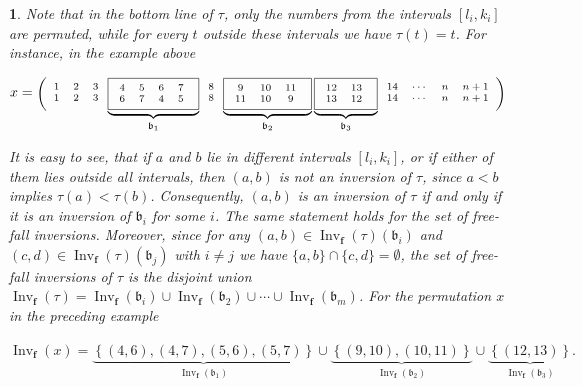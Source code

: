 \documentclass[a4 paper,12pt]{article}
\newcommand{\ger}[1]{\mathfrak{#1}}
\DeclareMathOperator{\Inv}{Inv}
\newtheorem{subnum}{}[numeris]
\begin{document}
\begin{subnum}
Note that in the bottom line of $\tau$, only the numbers from  the intervals $[l_i, k_i]$ are permuted, while for every $t$ outside these intervals we have $\tau(t) = t$. For instance, in the example above 
\begin{center}
$x =  \begin{scriptsize}\Bigg(
\begin{array}{ccc}
	1 & 2 & 3 \\
	1&2&  3
\end{array}
\underbrace{\framebox{$
\begin{array}{cccc}
	4 & 5 & 6&7 \\
	6 & 7 & 4&5
\end{array}$
}}_{\ger{b}_1}
\begin{array}{c}
	8\\
	8 
\end{array}
\underbrace{\framebox{$
\begin{array}{ccc}
	9 & 10 & 11  \\
	11 & 10 & 9 
\end{array}$
}}_{\ger{b}_2}\underbrace{\framebox{$
\begin{array}{cc}
	12 & 13   \\
	13 & 12 
\end{array}$
}}_{\ger{b}_3}
\begin{array}{cccc}
	14 & \cdots &n&n+1\\
	14 & \cdots &n&n+1
\end{array} \Bigg)\end{scriptsize}$
\end{center}
It is easy to see, that if $a$ and $b$ lie in different intervals $[l_i, k_i]$, or if either of them lies outside all intervals, then $(a,b)$ is not an inversion of $\tau$, since $a<b$ implies $\tau(a)<\tau(b)$. Consequently, $(a,b)$ is an inversion of $\tau$ if and only if it is an inversion of $\ger{b}_i$ for some $i$. The same statement holds for the set of free-fall inversions.  Moreover, since for any $(a,b) \in \Inv_{\textbf{f}}(\tau)(\ger{b}_i)$ and $(c,d) \in \Inv_{\textbf{f}}(\tau)(\ger{b}_j)$ with $i \neq j$ we have $\{a,b\} \cap \{c,d\} = \emptyset$, the set of  free-fall inversions of $\tau$ is the disjoint union
$
\Inv_{\textbf{f}}(\tau) =  \Inv_{\textbf{f}}(\ger{b}_i) \cup \Inv_{\textbf{f}}(\ger{b}_2) \cup \cdots \cup \Inv_{\textbf{f}}(\ger{b}_m) 
$. For the permutation $x$ in the preceding example
\begin{center}
$\Inv_{\textbf{f}}(x) =  \underbrace{\left\{(4,6), (4,7), (5,6), (5,7)\right\}}_{\Inv_{\textbf{f}}(\ger{b}_1)} \cup \underbrace{\left\{(9,10), (10,11)\right\}}_{\Inv_{\textbf{f}}(\ger{b}_2)} \cup \underbrace{\left\{(12,13)\right\}}_{\Inv_{\textbf{f}}(\ger{b}_3)} .$
\end{center}
\label{Remark_about_blocks_general}
\end{subnum}
\end{document}
